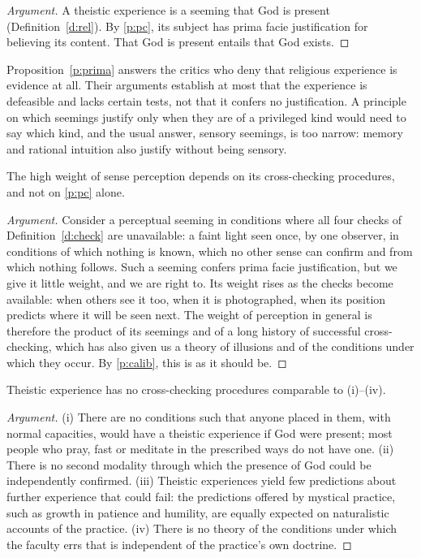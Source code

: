 \documentclass{situationist-preprint}
\begin{document}
\begin{proof}[Argument]
A theistic experience is a seeming that God is present (Definition~\ref{d:rel}). By \ref{p:pc}, its subject has prima facie justification for believing its content. That God is present entails that God exists.
\end{proof}

Proposition~\ref{p:prima} answers the critics who deny that religious experience is evidence at all. Their arguments establish at most that the experience is defeasible and lacks certain tests, not that it confers no justification. A principle on which seemings justify only when they are of a privileged kind would need to say which kind, and the usual answer, sensory seemings, is too narrow: memory and rational intuition also justify without being sensory.

\begin{lemma}\label{l:earned}
The high weight of sense perception depends on its cross-checking procedures, and not on \ref{p:pc} alone.
\end{lemma}

\begin{proof}[Argument]
Consider a perceptual seeming in conditions where all four checks of Definition~\ref{d:check} are unavailable: a faint light seen once, by one observer, in conditions of which nothing is known, which no other sense can confirm and from which nothing follows. Such a seeming confers prima facie justification, but we give it little weight, and we are right to. Its weight rises as the checks become available: when others see it too, when it is photographed, when its position predicts where it will be seen next. The weight of perception in general is therefore the product of its seemings and of a long history of successful cross-checking, which has also given us a theory of illusions and of the conditions under which they occur. By \ref{p:calib}, this is as it should be.
\end{proof}

\begin{lemma}\label{l:absent}
Theistic experience has no cross-checking procedures comparable to (i)--(iv).
\end{lemma}

\begin{proof}[Argument]
(i) There are no conditions such that anyone placed in them, with normal capacities, would have a theistic experience if God were present; most people who pray, fast or meditate in the prescribed ways do not have one. (ii) There is no second modality through which the presence of God could be independently confirmed. (iii) Theistic experiences yield few predictions about further experience that could fail: the predictions offered by mystical practice, such as growth in patience and humility, are equally expected on naturalistic accounts of the practice. (iv) There is no theory of the conditions under which the faculty errs that is independent of the practice's own doctrine.
\end{proof}
\end{document}
